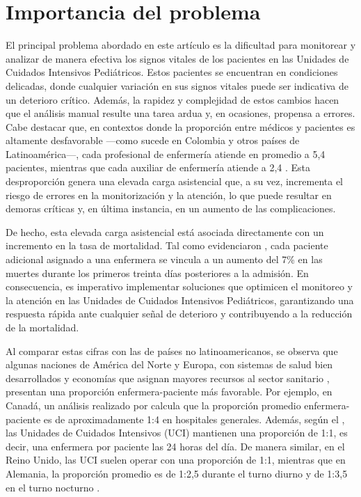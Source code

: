 \medskip

\section{Importancia del problema}

El principal problema abordado en este artículo es la dificultad para monitorear y analizar de manera efectiva los signos vitales de los pacientes en las Unidades de Cuidados Intensivos Pediátricos. Estos pacientes se encuentran en condiciones delicadas, donde cualquier variación en sus signos vitales puede ser indicativa de un deterioro crítico. Además, la rapidez y complejidad de estos cambios hacen que el análisis manual resulte una tarea ardua y, en ocasiones, propensa a errores. Cabe destacar que, en contextos donde la proporción entre médicos y pacientes es altamente desfavorable —como sucede en Colombia y otros países de Latinoamérica—, cada profesional de enfermería atiende en promedio a 5,4 pacientes, mientras que cada auxiliar de enfermería atiende a 2,4 \parencite{Arango2015}. Esta desproporción genera una elevada carga asistencial que, a su vez, incrementa el riesgo de errores en la monitorización y la atención, lo que puede resultar en demoras críticas y, en última instancia, en un aumento de las complicaciones.

De hecho, esta elevada carga asistencial está asociada directamente con un incremento en la tasa de mortalidad. Tal como evidenciaron \textcite{Aiken2002}, cada paciente adicional asignado a una enfermera se vincula a un aumento del 7\% en las muertes durante los primeros treinta días posteriores a la admisión. En consecuencia, es imperativo implementar soluciones que optimicen el monitoreo y la atención en las Unidades de Cuidados Intensivos Pediátricos, garantizando una respuesta rápida ante cualquier señal de deterioro y contribuyendo a la reducción de la mortalidad.

Al comparar estas cifras con las de países no latinoamericanos, se observa que algunas naciones de América del Norte y Europa, con sistemas de salud bien desarrollados y economías que asignan mayores recursos al sector sanitario \parencite{oecd2024society}, presentan una proporción enfermera-paciente más favorable. Por ejemplo, en Canadá, un análisis realizado por \textcite{Ariste2019} calcula que la proporción promedio enfermera-paciente es de aproximadamente 1:4 en hospitales generales. Además, según el \textcite{MinistryHealth2024}, las Unidades de Cuidados Intensivos (UCI) mantienen una proporción de 1:1, es decir, una enfermera por paciente las 24 horas del día. De manera similar, en el Reino Unido, las UCI suelen operar con una proporción de 1:1, mientras que en Alemania, la proporción promedio es de 1:2,5 durante el turno diurno y de 1:3,5 en el turno nocturno \parencite{Depasse1998}.

